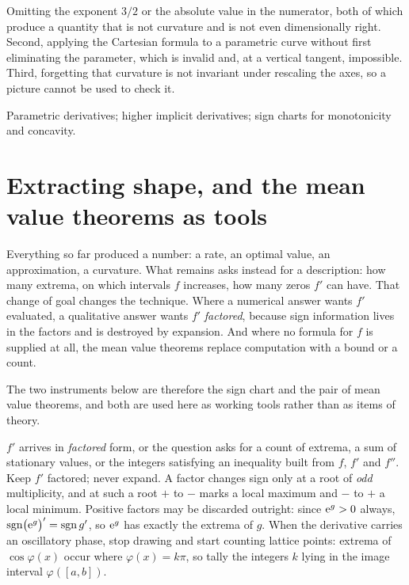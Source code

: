 \begin{trap}
Omitting the exponent $3/2$ or the absolute value in the numerator, both of which produce a quantity that is not curvature and is not even dimensionally right. Second, applying the Cartesian formula to a parametric curve without first eliminating the parameter, which is invalid and, at a vertical tangent, impossible. Third, forgetting that curvature is not invariant under rescaling the axes, so a picture cannot be used to check it.
\end{trap}

\begin{seealsob}Parametric derivatives; higher implicit derivatives; sign charts for monotonicity and concavity.\end{seealsob}

\section{Extracting shape, and the mean value theorems as tools}

Everything so far produced a number: a rate, an optimal value, an approximation, a curvature. What remains asks instead for a description: how many extrema, on which intervals $f$ increases, how many zeros $f'$ can have. That change of goal changes the technique. Where a numerical answer wants $f'$ evaluated, a qualitative answer wants $f'$ \emph{factored}, because sign information lives in the factors and is destroyed by expansion. And where no formula for $f$ is supplied at all, the mean value theorems replace computation with a bound or a count.

The two instruments below are therefore the sign chart and the pair of mean value theorems, and both are used here as working tools rather than as items of theory.

\cue $f'$ arrives in \emph{factored} form, or the question asks for a count of extrema, a sum of stationary values, or the integers satisfying an inequality built from $f$, $f'$ and $f''$.
\method Keep $f'$ factored; never expand. A factor changes sign only at a root of \emph{odd} multiplicity, and at such a root $+$ to $-$ marks a local maximum and $-$ to $+$ a local minimum. Positive factors may be discarded outright: since $\mathrm{e}^{g}>0$ always, $\operatorname{sgn}\bigl(\mathrm{e}^{g}\bigr)'=\operatorname{sgn} g'$, so $\mathrm{e}^{g}$ has exactly the extrema of $g$. When the derivative carries an oscillatory phase, stop drawing and start counting lattice points: extrema of $\cos\varphi(x)$ occur where $\varphi(x)=k\pi$, so tally the integers $k$ lying in the image interval $\varphi([a,b])$.

